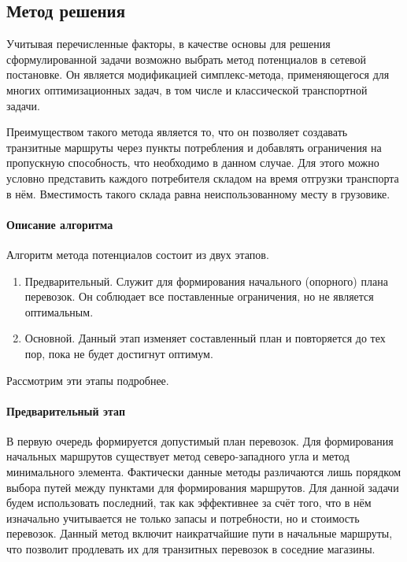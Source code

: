 \subsection{Метод решения}
	Учитывая перечисленные факторы, в качестве основы для решения сформулированной задачи возможно выбрать метод потенциалов в сетевой постановке. Он является модификацией симплекс-метода, применяющегося для многих оптимизационных задач, в том числе и классической транспортной задачи\cite{trans:potential}.
		
	Преимуществом такого метода является то, что он позволяет создавать транзитные маршруты через пункты потребления и добавлять ограничения на пропускную способность, что необходимо в данном случае. Для этого можно условно представить каждого потребителя складом на время отгрузки транспорта в нём. Вместимость такого склада равна неиспользованному месту в грузовике.
	
	\paragraph{Описание алгоритма}
	
	Алгоритм метода потенциалов состоит из двух этапов.
	\begin{enumerate}
		\item Предварительный. Служит для формирования начального (опорного) плана перевозок. Он соблюдает все поставленные ограничения, но не является оптимальным.
		\item Основной. Данный этап изменяет составленный план и повторяется до тех пор, пока не будет достигнут оптимум.
	\end{enumerate} 

	Рассмотрим эти этапы подробнее.
	
	\paragraph{Предварительный этап}
	В первую очередь формируется допустимый план перевозок. Для формирования начальных маршрутов существует метод северо-западного угла и метод минимального элемента. Фактически данные методы различаются лишь порядком выбора путей между пунктами для формирования маршрутов. Для данной задачи будем использовать последний, так как эффективнее\cite{potential:polyindex} за счёт того, что в нём изначально учитывается не только запасы и потребности, но и стоимость перевозок. Данный метод включит наикратчайшие пути в начальные маршруты, что позволит продлевать их  для транзитных перевозок в соседние магазины.
	
